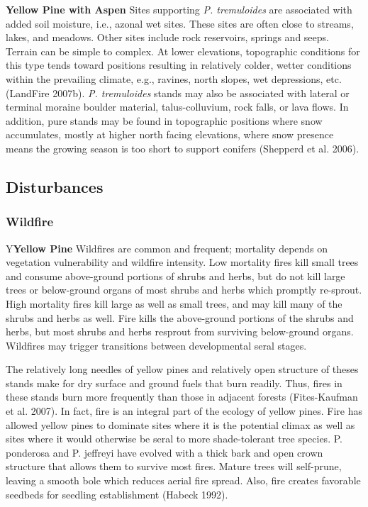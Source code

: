 \textbf{Yellow Pine with Aspen}	Sites supporting \emph{P. tremuloides} are associated with added soil moisture, i.e., azonal wet sites. These sites are often close to streams, lakes, and meadows. Other sites include rock reservoirs, springs and seeps. Terrain can be simple to complex. At lower elevations, topographic conditions for this type tends toward positions resulting in relatively colder, wetter conditions within the prevailing climate, e.g., ravines, north slopes, wet depressions, etc. (LandFire 2007b). \emph{P. tremuloides} stands may also be associated with lateral or terminal moraine boulder material, talus-colluvium, rock falls, or lava flows. In addition, pure stands may be found in topographic positions where snow accumulates, mostly at higher north facing elevations, where snow presence means the growing season is too short to support conifers (Shepperd et al. 2006). 


\subsection*{Disturbances}

\subsubsection{Wildfire}
Y\textbf{Yellow Pine}	Wildfires are common and frequent; mortality depends on vegetation vulnerability and wildfire intensity. Low mortality fires kill small trees and consume above-ground portions of shrubs and herbs, but do not kill large trees or below-ground organs of most shrubs and herbs which promptly re-sprout. High mortality fires kill large as well as small trees, and may kill many of the shrubs and herbs as well. Fire kills the above-ground portions of the shrubs and herbs, but most shrubs and herbs resprout from surviving below-ground organs. Wildfires may trigger transitions between developmental seral stages.

The relatively long needles of yellow pines and relatively open structure of theses stands make for dry surface and ground fuels that burn readily. Thus, fires in these stands burn more frequently than those in adjacent forests (Fites-Kaufman et al. 2007). In fact, fire is an integral part of the ecology of yellow pines. Fire has allowed yellow pines to dominate sites where it is the potential climax as well as sites where it would otherwise be seral to more shade-tolerant tree species. P. ponderosa and P. jeffreyi have evolved with a thick bark and open crown structure that allows them to survive most fires. Mature trees will self-prune, leaving a smooth bole which reduces aerial fire spread. Also, fire creates favorable seedbeds for seedling establishment (Habeck 1992). 

